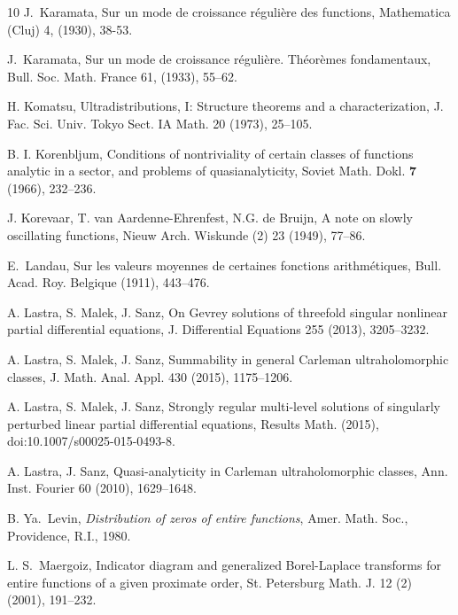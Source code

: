 \documentclass[11pt,a4paper]{article}
\theoremstyle{definition}
\begin{document}
\begin{thebibliography}{10}
 J.~Karamata, Sur un mode de croissance r\'eguli\`ere des functions,
Mathematica (Cluj)  4, (1930), 38-53.

 J.~Karamata, Sur un mode de croissance r\'eguli\`ere. Th\'eor\`emes fondamentaux, Bull. Soc. Math. France 61, (1933), 55--62.


 H. Komatsu, Ultradistributions, I: Structure theorems and a characterization,
J. Fac. Sci. Univ. Tokyo Sect. IA Math.  20 (1973), 25--105.

 B. I. Korenbljum, Conditions of nontriviality of certain classes of functions analytic
in a sector, and problems of quasianalyticity, Soviet Math. Dokl. {\bf 7} (1966), 232--236.

  J. Korevaar, T. van Aardenne-Ehrenfest, N.G. de Bruijn, A note on slowly oscillating functions,
Nieuw Arch. Wiskunde (2) 23 (1949), 77--86.

 E.~Landau, Sur les valeurs moyennes de certaines fonctions arithm\'etiques,
Bull. Acad. Roy. Belgique (1911), 443--476.


 A. Lastra, S. Malek, J. Sanz, On Gevrey solutions of threefold singular
nonlinear partial differential equations, J. Differential Equations 255 (2013), 3205--3232.

 A. Lastra, S. Malek, J. Sanz, Summability in general Carleman ultraholomorphic
classes, J. Math. Anal. Appl. 430 (2015), 1175--1206.

 A. Lastra, S. Malek, J. Sanz, Strongly regular multi-level solutions
of singularly perturbed linear partial differential equations, Results Math. (2015), doi:10.1007/s00025-015-0493-8.

 A. Lastra, J. Sanz, Quasi-analyticity in Carleman
ultraholomorphic classes, Ann. Inst. Fourier 60 (2010), 1629--1648.


 B. Ya.~Levin, \emph{Distribution of zeros of entire functions}, Amer. Math. Soc., Providence, R.I., 1980.

 L. S.~Maergoiz,
Indicator diagram and generalized Borel-Laplace transforms for entire functions of a given proximate order,
St. Petersburg Math. J. 12 (2) (2001), 191--232.


\end{thebibliography}
\end{document}
